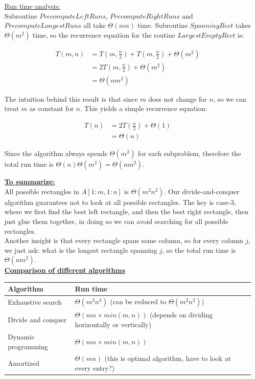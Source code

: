\documentclass[11pt]{article}
\begin{document}
\underline{Run time analysis:}\\
Subroutine $PrecomputeLeftRuns$, $PrecomputeRightRuns$ and
$PrecomputeLongestRuns$ all take $\Theta(mn)$ time. Subroutine
$SpanningRect$ takes $\Theta(m^2)$ time, so the recurrence equation
for the routine $LargestEmptyRect$ is:

\begin{equation}
\begin{split}
  T(m,n) &= T(m,\frac{n}{2}) + T(m,\frac{n}{2}) + \Theta(m^2)\\
  &= 2T(m,\frac{n}{2}) + \Theta(m^2)\\
  &= \Theta(nm^2)
\end{split}
\end{equation}

The intuition behind this result is that since $m$ does not change for
$n$, so we can treat $m$ as constant for $n$. This yields a simple
recurrence equation:

\begin{equation}
\begin{split}
  T(n) &= 2T(\frac{n}{2}) + \Theta(1)\\
  &= \Theta(n)
\end{split}
\end{equation}

Since the algorithm always spends $\Theta(m^2)$ for each subproblem,
therefore the total run time is $\Theta(n)\Theta(m^2) = \Theta(nm^2)$.

\underline{\textbf{To summarize:}}\\

All possible rectangles in $A[1:m,1:n]$ is $\Theta(m^2n^2)$. Our
divide-and-conquer algorithm guarantees not to look at all possible
rectangles. The key is case-3, where we first find the best left
rectangle, and then the best right rectangle, then just glue them
together, in doing so we can avoid searching for all possible
rectangles. \\

Another insight is that every rectangle spans some column, so for
every column $j$, we just ask: what is the longest rectangle spanning
$j$, so the total run time is $\Theta(nm^2)$.\\

\underline{\textbf{Comparison of different algorithms}}\\

\begin{center}
    \begin{tabular}{ | l | l |}
    \hline
    Algorithm & Run time \\ \hline
    Exhaustive search & $\Theta(m^3n^3)$ (can be reduced to
    $\Theta(m^2n^2)$) \\ \hline
    Divide and conquer & $\Theta(mn \times min(m,n))$ (depends on
    dividing horizontally or vertically) \\ \hline
    Dynamic programming & $\Theta(mn \times min(m,n))$ \\ \hline
    Amortized & $\Theta(mn)$ (this is optimal algorithm, have to look
    at every entry?) \\ \hline
    \end{tabular}
\end{center}
\end{document}
